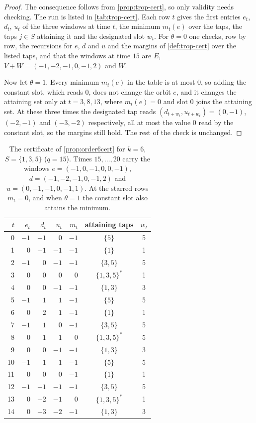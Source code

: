 \begin{proof}
The consequence follows from \autoref{prop:trop-cert}, so only validity needs
checking. The run is listed in \autoref{tab:trop-cert}. Each row $t$ gives the
first entries $e_t$, $d_t$, $u_t$ of the three windows at time $t$, the minimum
$m_t(e)$ over the taps, the taps $j\in S$ attaining it and the designated slot $w_t$.
For $\theta=0$ one checks, row by row, the recursions for $e$, $d$ and $u$ and
the margins of \autoref{def:trop-cert} over the listed taps, and that the
windows at time $15$ are $E$, $V+W=(-1,-2,-1,0,-1,2)$ and $W$.

Now let $\theta=1$. Every minimum $m_t(e)$ in the table is at most $0$, so adding
the constant slot, which reads $0$, does not change the orbit $e$, and it changes
the attaining set only at $t=3,8,13$, where $m_t(e)=0$ and slot $0$ joins the
attaining set. At these three times the designated tap reads
$(d_{t+w_t},u_{t+w_t})=(0,-1)$, $(-2,-1)$ and $(-3,-2)$ respectively, all at most
the value $0$ read by the constant slot, so the margins still hold. The rest of
the check is unchanged.
\end{proof}

\begin{table}
\centering
\small
\begin{tabular}{rrrrrcc}
$t$ & $e_t$ & $d_t$ & $u_t$ & $m_t$ & attaining taps & $w_t$\\
\hline
0 & $-1$ & $-1$ & $0$ & $-1$ & $\{5\}$ & 5\\
1 & $0$ & $-1$ & $-1$ & $-1$ & $\{1\}$ & 1\\
2 & $-1$ & $0$ & $-1$ & $-1$ & $\{3,5\}$ & 5\\
3 & $0$ & $0$ & $0$ & $0$ & $\{1,3,5\}^*$ & 1\\
4 & $0$ & $0$ & $-1$ & $-1$ & $\{1,3\}$ & 3\\
5 & $-1$ & $1$ & $1$ & $-1$ & $\{5\}$ & 5\\
6 & $0$ & $2$ & $1$ & $-1$ & $\{1\}$ & 1\\
7 & $-1$ & $1$ & $0$ & $-1$ & $\{3,5\}$ & 5\\
8 & $0$ & $1$ & $1$ & $0$ & $\{1,3,5\}^*$ & 5\\
9 & $0$ & $0$ & $-1$ & $-1$ & $\{1,3\}$ & 3\\
10 & $-1$ & $1$ & $1$ & $-1$ & $\{5\}$ & 5\\
11 & $0$ & $0$ & $0$ & $-1$ & $\{1\}$ & 1\\
12 & $-1$ & $-1$ & $-1$ & $-1$ & $\{3,5\}$ & 5\\
13 & $0$ & $-2$ & $-1$ & $0$ & $\{1,3,5\}^*$ & 1\\
14 & $0$ & $-3$ & $-2$ & $-1$ & $\{1,3\}$ & 3\\
\end{tabular}
\caption{The certificate of \autoref{prop:order6cert} for $k=6$, $S=\{1,3,5\}$
($q=15$). Times $15,\dots,20$ carry the windows $e=(-1,0,-1,0,0,-1)$,
$d=(-1,-2,-1,0,-1,2)$ and $u=(0,-1,-1,0,-1,1)$. At the starred rows
$m_t=0$, and when $\theta=1$ the constant slot also attains the minimum.}
\label{tab:trop-cert}
\end{table}


